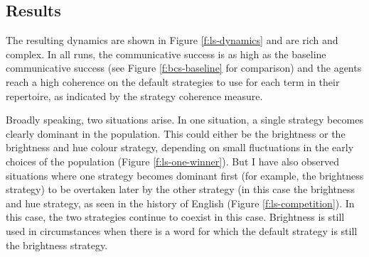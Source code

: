 \subsection{Results}

The resulting dynamics are shown in Figure \ref{f:ls-dynamics} and are
rich and complex. In all runs, the communicative success is as high as
the baseline communicative success (see Figure
\ref{f:bcs-baseline} for comparison) and the agents reach a
high coherence on the default strategies to use for each term in their
repertoire, as indicated by the strategy coherence measure.

Broadly speaking, two situations arise. In one situation, a single
strategy becomes clearly dominant in the population. This could either
be the brightness or the brightness and hue colour strategy, depending
on small fluctuations in the early choices of the population (Figure
\ref{f:ls-one-winner}). But I have also observed situations where one
strategy becomes dominant first (for example, the brightness
  strategy) to be overtaken later by the other strategy (in this case
the brightness and hue strategy, as seen in the history of
English (Figure \ref{f:ls-competition}). In this case, the two
strategies continue to coexist in this case. Brightness is still used
in circumstances when there is a word for which the default strategy
is still the brightness strategy.

